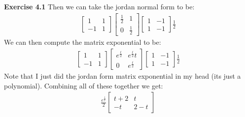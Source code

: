 \documentclass[12pt]{article}
\newenvironment{exercise}[1]{\vspace{.1in}\noindent\textbf{Exercise #1 \hspace{.05em}}}{}
\theoremstyle{definition}
\theoremstyle{remark}
\begin{document}
\begin{exercise}{4.1}
	Then we can take the jordan normal form to be:
	\begin{align}
		\begin{bmatrix}
			1  & 1 \\
			-1 & 1
		\end{bmatrix}%
		\begin{bmatrix}
			\frac{1}{2} & 1           \\
			0           & \frac{1}{2}
		\end{bmatrix}%
		\begin{bmatrix}
			1 & -1 \\
			1 & -1
		\end{bmatrix}\frac{1}{2}
	\end{align}
	We can then compute the matrix exponential to be:
	\begin{align}
		\begin{bmatrix}
			1  & 1 \\
			-1 & 1
		\end{bmatrix}%
		\begin{bmatrix}
			e^{\frac{t}{2}} & e^{\frac{t}{2}}t \\
			0               & e^\frac{t}{2}
		\end{bmatrix}%
		\begin{bmatrix}
			1 & -1 \\
			1 & -1
		\end{bmatrix}\frac{1}{2}
	\end{align}
	Note that I just did the jordan form matrix exponential in my head (its just a polynomial). Combining all of these together we get:
	\begin{align}
		\frac{e^\frac{t}{2}}{2}%
		\begin{bmatrix}
			t+2 & t   \\
			-t  & 2-t
		\end{bmatrix}
	\end{align}



\end{exercise}
\end{document}
